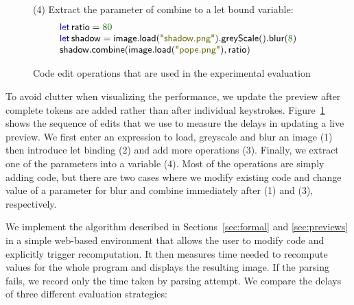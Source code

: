 \documentclass[english,submission]{programming}
\theoremstyle{plain}
\theoremstyle{definition}
\newcommand{\num}[1]{\textcolor{numclr}{#1}}
\newcommand{\str}[1]{\textnormal{\textcolor{strclr}{\sffamily "#1"}}}
\newcommand{\ident}[1]{\textnormal{\textcolor{idclr}{\sffamily #1}}}
\newcommand{\kvd}[1]{\textnormal{\textcolor{kvdclr}{\sffamily #1}}}
\begin{document}
\begin{figure}
{\small\sffamily (4) Extract the parameter of combine to a let bound variable:}
\vspace{-0.5em}
\begin{equation*}
\begin{array}{l}
\kvd{let}\,\ident{ratio} = \num{80} \\
\kvd{let}\,\ident{shadow}=\ident{image}.\ident{load}(\str{shadow.png}).\ident{greyScale}().\ident{blur}(\num{8})\\
\ident{shadow}.\ident{combine}(\ident{image}.\ident{load}(\str{pope.png}), \ident{ratio})
\end{array}
\end{equation*}

\vspace{-1em}
\caption{Code edit operations that are used in the experimental evaluation}
\label{fig:image-edits}
\vspace{-0.5em}
\end{figure}


To avoid clutter when visualizing the performance, we update the preview after complete tokens are
added rather than after individual keystrokes.
Figure~\ref{fig:image-edits} shows the sequence of edits that we use to measure
the delays in updating a live preview. We first enter an expression to load, greyscale and blur
an image (1) then introduce let binding (2) and add more operations (3). Finally, we extract
one of the parameters into a variable (4). Most of the operations are simply adding code, but
there are two cases where we modify existing code and change value of a parameter for \ident{blur}
and \ident{combine} immediately after (1) and (3), respectively.

We implement the algorithm described in Sections~\ref{sec:formal} and \ref{sec:previews} in a
simple web-based environment that allows the user to modify code and explicitly trigger
recomputation. It then measures time needed to recompute values for the whole program and
displays the resulting image. If the parsing fails, we record only the time taken by parsing attempt. We compare the
delays of three different evaluation strategies:
\end{document}

